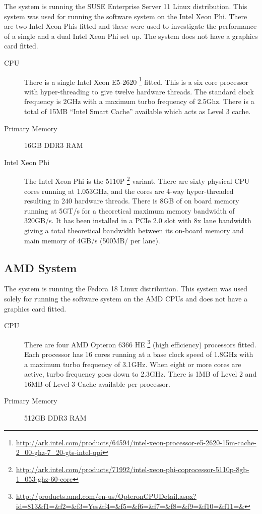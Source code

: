 The system is running the SUSE Enterprise Server 11 Linux distribution. This
system was used for running the software system on the Intel Xeon Phi. There are
two Intel Xeon Phis fitted and these were used to investigate the performance of
a single and a dual Intel Xeon Phi set up. The system does not have a graphics
card fitted.

\begin{description}

\item[CPU] There is a single Intel Xeon E5-2620
\footnote{\url{http://ark.intel.com/products/64594/intel-xeon-processor-e5-2620-15m-cache-2_00-ghz-7_20-gts-intel-qpi}}
fitted. This is a six core processor with hyper-threading to give twelve
hardware threads. The standard clock frequency is 2GHz with a maximum turbo
frequency of 2.5Ghz. There is a total of 15MB ``Intel Smart Cache'' available
which acts as Level 3 cache.

\item[Primary Memory] 16GB DDR3 RAM

\item[Intel Xeon Phi] The Intel Xeon Phi is the 5110P
\footnote{\url{http://ark.intel.com/products/71992/intel-xeon-phi-coprocessor-5110p-8gb-1_053-ghz-60-core}}
variant. There are sixty physical CPU cores running at 1.053GHz, and the cores
are 4-way hyper-threaded resulting in 240 hardware threads. There is 8GB of on
board memory running at 5GT/s for a theoretical maximum memory bandwidth of
320GB/s. It has been installed in a PCIe 2.0 slot with 8x lane bandwidth giving
a total theoretical bandwidth between its on-board memory and main memory of
4GB/s (500MB/ per lane).

\end{description}

\subsection{AMD System}

The system is running the Fedora 18 Linux distribution. This system was used
solely for running the software system on the AMD CPUs and does not have a
graphics card fitted.

\begin{description}

\item[CPU] There are four AMD Opteron 6366 HE
\footnote{\url{http://products.amd.com/en-us/OpteronCPUDetail.aspx?id=813&f1=&f2=&f3=Yes&f4=&f5=&f6=&f7=&f8=&f9=&f10=&f11=&}}
(high efficiency) processors fitted. Each processor has 16 cores running at a
base clock speed of 1.8GHz with a maximum turbo frequency of 3.1GHz. When eight
or more cores are active, turbo frequency goes down to 2.3GHz. There is 1MB of
Level 2 and 16MB of Level 3 Cache available per processor.

\item[Primary Memory] 512GB DDR3 RAM

\end{description}

